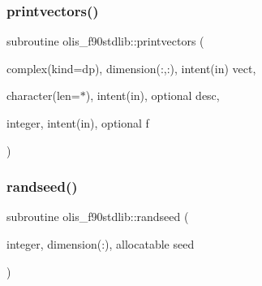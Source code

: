 \mbox{\label{namespaceolis__f90stdlib_a9780b39329025edfdef71ce07e250808}} 
\subsubsection{\texorpdfstring{printvectors()}{printvectors()}}
{\footnotesize\ttfamily subroutine olis\+\_\+f90stdlib\+::printvectors (\begin{DoxyParamCaption}\item[{complex(kind=dp), dimension(\+:,\+:), intent(in)}]{vect,  }\item[{character(len=$\ast$), intent(in), optional}]{desc,  }\item[{integer, intent(in), optional}]{f }\end{DoxyParamCaption})}

\mbox{\label{namespaceolis__f90stdlib_a560e235cbabaf74da88a2ec97eda5628}} 
\subsubsection{\texorpdfstring{randseed()}{randseed()}}
{\footnotesize\ttfamily subroutine olis\+\_\+f90stdlib\+::randseed (\begin{DoxyParamCaption}\item[{integer, dimension(\+:), allocatable}]{seed }\end{DoxyParamCaption})}

